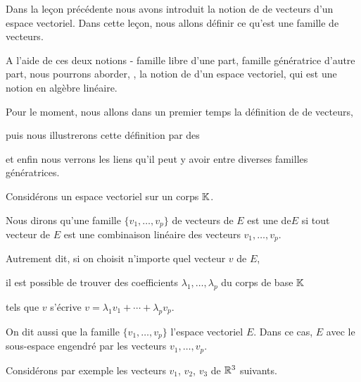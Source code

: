 






\debuttexte


\diapo
Dans la le\c{c}on précédente nous avons introduit la notion de  de vecteurs d'un espace vectoriel.
Dans cette le\c{c}on, nous allons définir  ce qu'est une famille  de vecteurs. 

\change
A l'aide de ces deux notions - famille libre d'une part, famille génératrice d'autre part, nous pourrons aborder, , la notion de  d'un espace vectoriel,  qui est une notion  en algèbre linéaire.

\change
Pour le moment, nous allons dans un premier temps  la définition de  de vecteurs,

\change
puis nous illustrerons cette définition par des  

\change 
et enfin nous verrons les liens qu'il peut y avoir entre diverses familles génératrices. 



\diapo
Considérons un espace vectoriel sur un corps $\mathbb{K}$.

Nous dirons qu'une famille $\{v_1,\dots ,v_p\}$ de vecteurs de $E$ est une  de$E$ 
si tout vecteur de $E$ est une combinaison linéaire des vecteurs $v_1,\dots ,v_p$.

\change
Autrement dit, si on choisit n'importe quel vecteur $v$ de $E$, 

\change
il est possible de trouver des coefficients 
$ \lambda_1, \ldots,\lambda_p $ du corps de base $\mathbb{K}$ 

\change 
tels que $v$ s'écrive
$v=\lambda_1 v_1+\cdots + \lambda_p v_p.$

On dit aussi que la famille $\{v_1,\dots ,v_p\}$  l'espace vectoriel $E$. Dans ce cas,
 $E$  avec le sous-espace engendré par les vecteurs $v_1,\ldots,v_p$.




\diapo
Considérons par exemple les vecteurs $v_1$, $v_2$, $v_3$ de $\mathbb{R}^3$ suivants.

